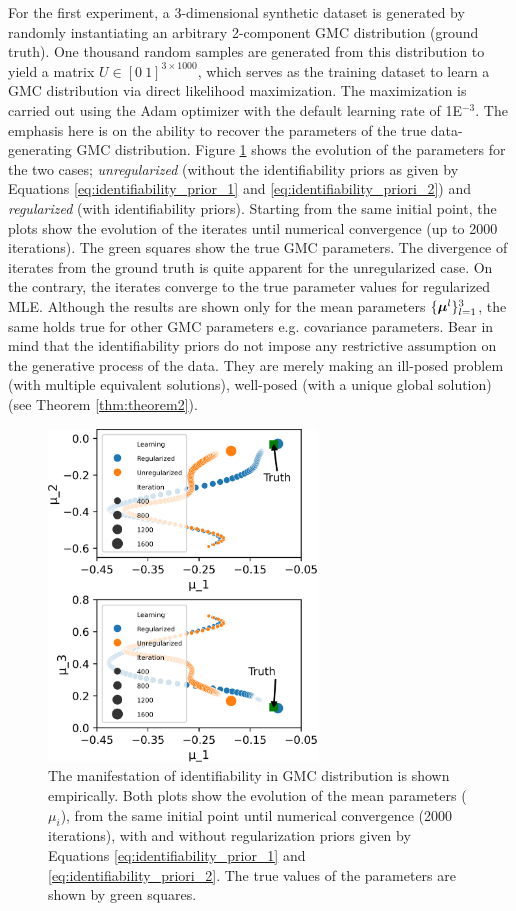 \documentclass{article}
\theoremstyle{plain}
\theoremstyle{definition}
\theoremstyle{remark}
\begin{document}
For the first experiment, a 3-dimensional synthetic dataset is generated by randomly instantiating an arbitrary 2-component GMC distribution (ground truth). One thousand random samples are generated from this distribution to yield a matrix $U \in [0 \ 1]^{3\times 1000}$, which serves as the training dataset to learn a GMC distribution via direct likelihood maximization. The maximization is carried out using the Adam optimizer \citep{Kingma2014} with the default learning rate of 1E$^{-3}$. The emphasis here is on the ability to recover the parameters of the true data-generating GMC distribution. Figure \ref{fig:identifiability_exp} shows the evolution of the parameters for the two cases; \emph{unregularized} (without the identifiability priors as given by Equations \eqref{eq:identifiability_prior_1} and \eqref{eq:identifiability_priori_2}) and \emph{regularized} (with identifiability priors). Starting from the same initial point, the plots show the evolution of the iterates until numerical convergence (up to 2000 iterations). The green squares show the true GMC parameters. The divergence of iterates from the ground truth is quite apparent for the unregularized case. On the contrary, the iterates converge to the true parameter values for regularized MLE. Although the results are shown only for the mean parameters $\{\boldsymbol{\mu}^l \}_{l=1}^3$, the same holds true for other GMC parameters e.g. covariance parameters. Bear in mind that the identifiability priors do not impose any restrictive assumption on the generative process of the data. They are merely making an ill-posed problem (with multiple equivalent solutions), well-posed (with a unique global solution) (see Theorem \eqref{thm:theorem2}).
\begin{figure}[ht]
\vskip 0.2in
\begin{center}
\centerline{\includegraphics[width= \columnwidth,height=250pt]{figures/Identifiability_Experiment.png}}
\caption{The manifestation of identifiability in GMC distribution is shown empirically. Both plots show the evolution of the mean parameters ($\mu_i$), from the same initial point until numerical convergence (2000 iterations), with and without regularization priors given by Equations \eqref{eq:identifiability_prior_1} and \eqref{eq:identifiability_priori_2}. The true values of the  parameters are shown by green squares.}
\label{fig:identifiability_exp}
\end{center}
\vskip -0.2in
\end{figure} 
\end{document}
